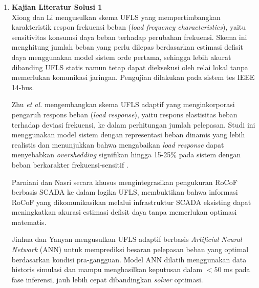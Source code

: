 \begin{enumerate}
\item[a.] \textbf{Kajian Literatur Solusi 1} \\
Xiong dan Li \cite{Xiong2006} mengusulkan skema UFLS yang mempertimbangkan karakteristik respon frekuensi beban (\textit{load frequency characteristics}), yaitu sensitivitas konsumsi daya beban terhadap perubahan frekuensi. Skema ini menghitung jumlah beban yang perlu dilepas berdasarkan estimasi defisit daya menggunakan model sistem orde pertama, sehingga lebih akurat dibanding UFLS statis namun tetap dapat dieksekusi oleh relai lokal tanpa memerlukan komunikasi jaringan. Pengujian dilakukan pada sistem tes IEEE 14-bus.

Zhu \textit{et al.} \cite{Zhu2021} mengembangkan skema UFLS adaptif yang menginkorporasi pengaruh respons beban (\textit{load response}), yaitu respons elastisitas beban terhadap deviasi frekuensi, ke dalam perhitungan jumlah pelepasan. Studi ini menggunakan model sistem dengan representasi beban dinamis yang lebih realistis dan menunjukkan bahwa mengabaikan \textit{load response} dapat menyebabkan \textit{overshedding} signifikan hingga 15-25\% pada sistem dengan beban berkarakter frekuensi-sensitif \cite{Zhu2021}.

Parniani dan Nasri \cite{Parniani2006} secara khusus mengintegrasikan pengukuran RoCoF berbasis SCADA ke dalam logika UFLS, membuktikan bahwa informasi RoCoF yang dikomunikasikan melalui infrastruktur SCADA eksisting dapat meningkatkan akurasi estimasi defisit daya tanpa memerlukan optimasi matematis.

Jinhua dan Yanyan \cite{Jinhua2022} mengusulkan UFLS adaptif berbasis \textit{Artificial Neural Network} (ANN) untuk memprediksi besaran pelepasan beban yang optimal berdasarkan kondisi pra-gangguan. Model ANN dilatih menggunakan data historis simulasi dan mampu menghasilkan keputusan dalam $< 50$ ms pada fase inferensi, jauh lebih cepat dibandingkan \textit{solver} optimasi.


\end{enumerate}
